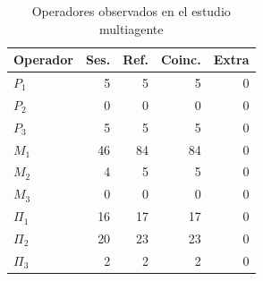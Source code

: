 \begin{table}[!t]
\caption{Operadores observados en el estudio multiagente}
\label{tab:multi_operators}
\centering\footnotesize
\begin{tabular}{lrrrr}
\hline
Operador & Ses. & Ref. & Coinc. & Extra\\
\hline
$P_1$ & 5 & 5 & 5 & 0\\
$P_2$ & 0 & 0 & 0 & 0\\
$P_3$ & 5 & 5 & 5 & 0\\
$M_1$ & 46 & 84 & 84 & 0\\
$M_2$ & 4 & 5 & 5 & 0\\
$M_3$ & 0 & 0 & 0 & 0\\
$\Pi_1$ & 16 & 17 & 17 & 0\\
$\Pi_2$ & 20 & 23 & 23 & 0\\
$\Pi_3$ & 2 & 2 & 2 & 0\\
\hline
\end{tabular}
\end{table}
